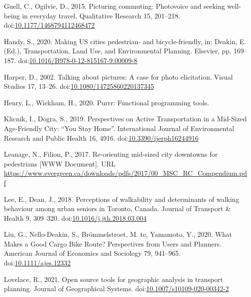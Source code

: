 \documentclass[]{elsarticle} %
\begin{document}
\leavevmode\hypertarget{ref-guellPicturingCommutingPhotovoice2015}{}%
Guell, C., Ogilvie, D., 2015. Picturing commuting: Photovoice and
seeking well-being in everyday travel. Qualitative Research 15,
201--218.
doi:\href{https://doi.org/10.1177/1468794112468472}{10.1177/1468794112468472}

\leavevmode\hypertarget{ref-handyMakingUSCities2020}{}%
Handy, S., 2020. Making US cities pedestrian- and bicycle-friendly, in:
Deakin, E. (Ed.), Transportation, Land Use, and Environmental Planning.
Elsevier, pp. 169--187.
doi:\href{https://doi.org/10.1016/B978-0-12-815167-9.00009-8}{10.1016/B978-0-12-815167-9.00009-8}

\leavevmode\hypertarget{ref-harperTalkingPicturesCase2002}{}%
Harper, D., 2002. Talking about pictures: A case for photo elicitation.
Visual Studies 17, 13--26.
doi:\href{https://doi.org/10.1080/14725860220137345}{10.1080/14725860220137345}

\leavevmode\hypertarget{ref-R-purrr}{}%
Henry, L., Wickham, H., 2020. Purrr: Functional programming tools.

\leavevmode\hypertarget{ref-klicnikPerspectivesActiveTransportation2019}{}%
Klicnik, I., Dogra, S., 2019. Perspectives on Active Transportation in a
Mid-Sized Age-Friendly City: ``You Stay Home''. International Journal of
Environmental Research and Public Health 16, 4916.
doi:\href{https://doi.org/10.3390/ijerph16244916}{10.3390/ijerph16244916}

\leavevmode\hypertarget{ref-leanagereorientingmidsized2017}{}%
Leanage, N., Filion, P., 2017. Re-orienting mid-sized city downtowns for
pedestrians {[}WWW Document{]}. URL
\url{https://www.evergreen.ca/downloads/pdfs/2017/00_MSC_RC_Compendium.pdf}

\leavevmode\hypertarget{ref-leePerceptionsWalkabilityDeterminants2018}{}%
Lee, E., Dean, J., 2018. Perceptions of walkability and determinants of
walking behaviour among urban seniors in Toronto, Canada. Journal of
Transport \& Health 9, 309--320.
doi:\href{https://doi.org/10.1016/j.jth.2018.03.004}{10.1016/j.jth.2018.03.004}

\leavevmode\hypertarget{ref-liuWhatMakesGood2020}{}%
Liu, G., Nello-Deakin, S., Brömmelstroet, M. te, Yamamoto, Y., 2020.
What Makes a Good Cargo Bike Route? Perspectives from Users and
Planners. American Journal of Economics and Sociology 79, 941--965.
doi:\href{https://doi.org/10.1111/ajes.12332}{10.1111/ajes.12332}

\leavevmode\hypertarget{ref-lovelaceOpenSource2021}{}%
Lovelace, R., 2021. Open source tools for geographic analysis in
transport planning. Journal of Geographical Systems.
doi:\href{https://doi.org/10.1007/s10109-020-00342-2}{10.1007/s10109-020-00342-2}
\end{document}
